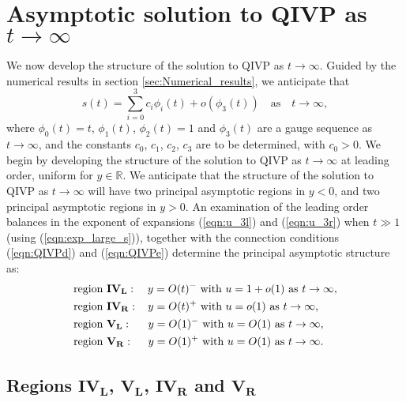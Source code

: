 \documentclass[11pt,a4paper]{article}
\newcommand{\eeref}[1]{(\ref{eqn:#1})}
\newcommand{\eelab}[1]{\label{eqn:#1}}
\newcommand{\ssref}[1]{\ref{sec:#1}}
\newcommand{\sslab}[1]{\label{sec:#1}}
\def\beq{\begin{equation}}
\def\eeq{\end{equation}}
\begin{document}
\section{Asymptotic solution to QIVP as $t \to \infty $} \sslab{large_time}
%
We now develop the structure of the solution to QIVP as $t \to \infty$. Guided by the numerical results in section \ssref{Numerical_results}, we anticipate that 
\beq 
s(t) = \sum^3_{i=0} c_i \phi_i(t)  + o(\phi_3(t))  \quad \mbox{as} \quad  t \to \infty, \eelab{exp_large_s}
\eeq
where $\phi_0(t)=t$, $\phi_1(t)$, $\phi_2(t)=1$ and $\phi_3(t)$ 
 are a gauge sequence as $t \to \infty$,  and the constants $c_0$, $c_1$, $c_2$,  $c_3$ are to be determined, with $c_0>0$. 
We begin by developing the structure of the solution to QIVP as $t \to \infty$ at leading order, uniform for $y \in \mathbb{R}$. We anticipate that the structure of the solution to QIVP as $t \to \infty$ will have two principal asymptotic regions in $y<0$, and two principal asymptotic regions in $y>0$. An examination of the leading order balances in the exponent of expansions \eeref{u_3l} and \eeref{u_3r} when $t \gg 1$ (using \eeref{exp_large_s}), together with the connection conditions \eeref{QIVPd} and  \eeref{QIVPe} determine the principal asymptotic structure as: 
\begin{subequations}
 \begin{align}
& \mbox{region $\mathbf{IV_L}$}:  \quad y = O(t)^-  \mbox{ with }  u=1+o(1) \mbox{  as  } t \to \infty,  \eelab{region_4l}  \\
& \mbox{region $\mathbf{IV_R}$}:  \hspace{0.31cm}  y = O(t)^+  \mbox{ with }  u=o(1) \mbox{  as  } t \to \infty, \eelab{region_4r} \\
& \mbox{region $\mathbf{V_L}$}:  \hspace{0.52cm}   y = O(1)^- \mbox{ with }  u=O(1) \mbox{  as  } t \to \infty, \eelab{region_5l}  \\
& \mbox{region $\mathbf{V_R}$}:  \hspace{0.47cm}   y = O(1)^+ \mbox{ with }  u=O(1) \mbox{  as  } t \to \infty.   \eelab{region_5r}
\end{align}  
\end{subequations}
%
\subsection{Regions  $\mathbf{IV_L}$,  $\mathbf{V_L}$, $\mathbf{IV_R}$
and  $\mathbf{V_R}$}
\end{document}
